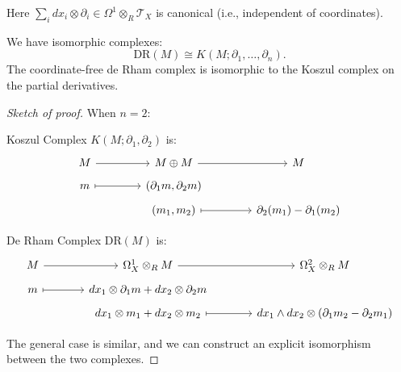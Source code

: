 \begin{remark}
    Here $\sum\limits_{i} dx_i \otimes \partial_i \in \Omega^1 \otimes_R \mathcal{T}_X$ is canonical (i.e., independent of coordinates).
\end{remark}

\begin{lemma}
    We have isomorphic complexes: $$\mathrm{DR}(M) \cong K(M; \partial_1, \ldots, \partial_n).$$The coordinate-free de Rham complex is isomorphic to the Koszul complex on the partial derivatives.
\end{lemma}
\begin{proof}[Sketch of proof]
    When $n = 2$:

    Koszul Complex $K(M; \partial_{1}, \partial_{2})$ is:
    \[
        \begin{tikzcd}[row sep=tiny, column sep=4em]
            M \arrow[r]
            & M \oplus M \arrow[r]
            & M \\
            m \arrow[r, mapsto]
            & (\partial_{1} m, \partial_{2} m)
            & \\
            & (m_1, m_2) \arrow[r, mapsto]
            & \partial_2(m_1) - \partial_1(m_2)
        \end{tikzcd}
    \]

    De Rham Complex $\mathrm{DR}(M)$ is:
    \[
        \begin{tikzcd}[row sep=tiny, column sep=large]
            M \arrow[r]
            & \Omega^{1}_{X}\otimes_{R} M \arrow[r]
            & \Omega_{X}^{2}\otimes_{R}M \\
            m \arrow[r, mapsto]
            & dx_{1}\otimes\partial_{1} m + dx_{2}\otimes\partial_{2}m
            & \\
            & dx_{1}\otimes m_{1} + dx_{2}\otimes m_{2} \arrow[r, mapsto]
            & dx_{1}\wedge dx_{2}\otimes(\partial_{1} m_{2}-\partial_{2} m_{1})
        \end{tikzcd}
    \]

    The general case is similar, and we can construct an explicit isomorphism between the two complexes.
\end{proof}

